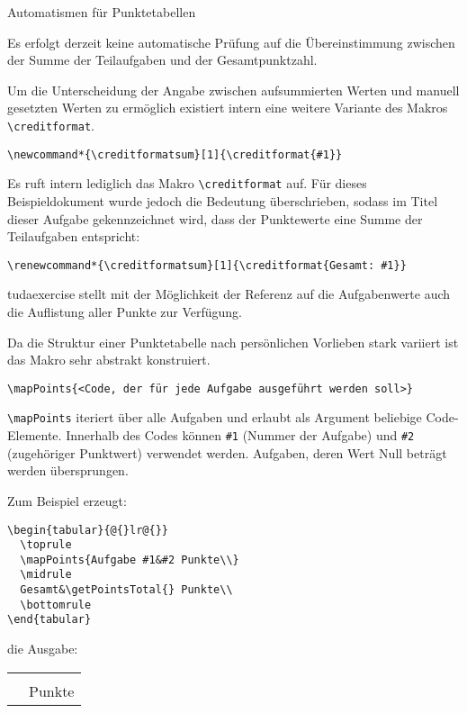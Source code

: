 \documentclass[
	german,%
	accentcolor=9c,%
	points=true, für die Aktivierung der Punktereferenzen
]{tudaexercise}
\renewcommand*{\creditformatsum}[1]{\creditformat{Gesamt: #1}}
\newcommand*{\code}[1]{\texttt{#1}}
\newcommand*{\cls}[1]{\textsf{#1}}
\let\tbs\textbackslash
\begin{document}
\begin{task}[points=auto]{Automatismen für Punktetabellen}
\begin{subtask}[points=2,title={Punkte aus Teilaufgaben aufsummieren}]
		Es erfolgt derzeit keine automatische Prüfung auf die Übereinstimmung zwischen der Summe der Teilaufgaben und der Gesamtpunktzahl.

		Um die Unterscheidung der Angabe zwischen aufsummierten Werten und manuell gesetzten Werten zu ermöglich existiert intern eine weitere Variante des Makros \code{\tbs{}creditformat}.

\begin{verbatim}
\newcommand*{\creditformatsum}[1]{\creditformat{#1}}
\end{verbatim}

		Es ruft intern lediglich das Makro \code{\tbs{}creditformat} auf. Für dieses Beispieldokument wurde jedoch die Bedeutung überschrieben, sodass im Titel dieser Aufgabe gekennzeichnet wird, dass der Punktewerte eine Summe der Teilaufgaben entspricht:

\begin{verbatim}
\renewcommand*{\creditformatsum}[1]{\creditformat{Gesamt: #1}}
\end{verbatim}
	\end{subtask}

	\begin{subtask}[points=3,title={Automatische Punktetabellen}]
		\cls{tudaexercise} stellt mit der Möglichkeit der Referenz auf die Aufgabenwerte auch die Auflistung aller Punkte zur Verfügung.

		Da die Struktur einer Punktetabelle nach persönlichen Vorlieben stark variiert ist das Makro sehr abstrakt konstruiert.

\begin{verbatim}
\mapPoints{<Code, der für jede Aufgabe ausgeführt werden soll>}
\end{verbatim}

		\code{\tbs{}mapPoints} iteriert über alle Aufgaben und erlaubt als Argument beliebige Code-Elemente. Innerhalb des Codes können \code{\#1} (Nummer der Aufgabe) und \code{\#2} (zugehöriger Punktwert) verwendet werden.
		Aufgaben, deren Wert Null beträgt werden übersprungen.

		Zum Beispiel erzeugt:
\begin{verbatim}
\begin{tabular}{@{}lr@{}}
  \toprule
  \mapPoints{Aufgabe #1&#2 Punkte\\}
  \midrule
  Gesamt&\getPointsTotal{} Punkte\\
  \bottomrule
\end{tabular}
\end{verbatim}
		die Ausgabe:\\
		\begin{tabular}{@{}lr@{}}
			\toprule
			\mapPoints{Aufgabe #1&#2 Punkte\\}
			\midrule
			Gesamt&\getPointsTotal{} Punkte\\
			\bottomrule
		\end{tabular}


\end{subtask}
\end{task}
\end{document}
